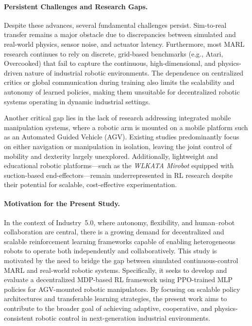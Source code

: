 \documentclass[english, 12pt, a4paper, elec, utf8, a-2b, online]{aaltothesis}
\begin{document}
\paragraph{Persistent Challenges and Research Gaps.}
Despite these advances, several fundamental challenges persist. Sim-to-real transfer remains a major obstacle due to discrepancies between simulated and real-world physics, sensor noise, and actuator latency. Furthermore, most MARL research continues to rely on discrete, grid-based benchmarks (e.g., Atari, Overcooked) that fail to capture the continuous, high-dimensional, and physics-driven nature of industrial robotic environments. The dependence on centralized critics or global communication during training also limits the scalability and autonomy of learned policies, making them unsuitable for decentralized robotic systems operating in dynamic industrial settings.

Another critical gap lies in the lack of research addressing integrated mobile manipulation systems, where a robotic arm is mounted on a mobile platform such as an Automated Guided Vehicle (AGV). Existing studies predominantly focus on either navigation or manipulation in isolation, leaving the joint control of mobility and dexterity largely unexplored. Additionally, lightweight and educational robotic platforms—such as the \textit{WLKATA Mirobot} equipped with suction-based end-effectors—remain underrepresented in RL research despite their potential for scalable, cost-effective experimentation. 

\paragraph{Motivation for the Present Study.}
In the context of Industry~5.0, where autonomy, flexibility, and human–robot collaboration are central, there is a growing demand for decentralized and scalable reinforcement learning frameworks capable of enabling heterogeneous robots to operate both independently and collaboratively. This study is motivated by the need to bridge the gap between simulated continuous-control MARL and real-world robotic systems. Specifically, it seeks to develop and evaluate a decentralized MDP-based RL framework using PPO-trained MLP policies for AGV-mounted robotic manipulators. By focusing on scalable policy architectures and transferable learning strategies, the present work aims to contribute to the broader goal of achieving adaptive, cooperative, and physics-consistent robotic control in next-generation industrial environments.
\end{document}
